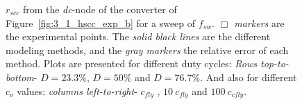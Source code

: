 \begin{figure}[!h]
\newcommand\pHeigh{3.25cm}
\newcommand\pWidth{2.5cm}
\centering
    \begin{subfigure}{\textwidth}
       \parbox[b]{.325\linewidth}{
            \raggedright
            
        }
       \parbox[b]{.325\linewidth}{
            \raggedleft
            
        }
       \parbox[b]{.325\linewidth}{
            \centering
            
        }
    \end{subfigure}

    \begin{subfigure}{\textwidth}
       \parbox[b]{.325\linewidth}{
            \raggedright
            
        }
       \parbox[b]{.325\linewidth}{
            \raggedleft
            
        }
       \parbox[b]{.325\linewidth}{
            \centering
            
        }
    \end{subfigure}

    \begin{subfigure}{\textwidth}
       \parbox[b]{.325\linewidth}{
            \raggedright
            
        }
       \parbox[b]{.325\linewidth}{
            \raggedleft
            
        }
       \parbox[b]{.325\linewidth}{
            \centering
            
        }
    \end{subfigure}



\caption{$r_{scc}$ from the \emph{dc}-node of the converter of Figure~\ref{fig:3_1_hscc_exp_b} for a sweep of $f_{sw}$. \emph{$\Box$ markers} are the experimental points. The \emph{solid black lines} are the different modeling methods, and the \emph{gray markers} the relative error of each method. Plots are presented for different duty cycles:  \emph{Rows top-to-bottom}- $D = 23.3\%$, $D = 50\%$ and $D = 76.7\%$. And also for different $c_o$ values: \emph{columns left-to-right}- $c_{fly}$ , $10~c_{fly} $ and $100~c_{cfly}$.}
\label{fig:exp_rscc_dc_node}
\end{figure}

